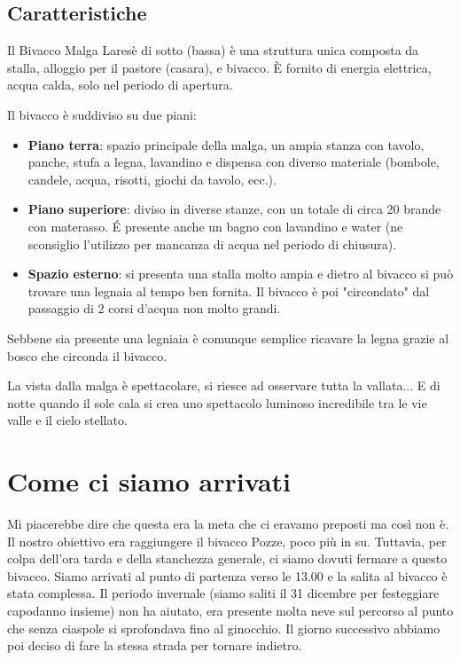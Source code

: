 \documentclass{article}
\begin{document}
\subsection{Caratteristiche}
Il Bivacco Malga Laresè di sotto (bassa) è una struttura unica composta da stalla, alloggio per il pastore (casara), e  bivacco. È fornito di energia elettrica, acqua calda, solo nel periodo di apertura.

Il bivacco è suddiviso su due piani:
\begin{itemize}
    \item \textbf{Piano terra}: spazio principale della malga, un ampia stanza con tavolo, panche, stufa a legna, lavandino e dispensa con diverso materiale (bombole, candele, acqua, risotti, giochi da tavolo, ecc.).
    \item \textbf{Piano superiore}: diviso in diverse stanze, con un totale di circa 20 brande con materasso. \'E presente anche un bagno con lavandino e water (ne sconsiglio l'utilizzo per mancanza di acqua nel periodo di chiusura).
    \item \textbf{Spazio esterno}: si presenta una stalla molto ampia e dietro al bivacco si può trovare una legnaia al tempo ben fornita. Il bivacco è poi "circondato" dal passaggio di 2 corsi d'acqua non molto grandi.
\end{itemize}

Sebbene sia presente una legniaia è comunque semplice ricavare la legna grazie al bosco che circonda il bivacco.

La vista dalla malga è spettacolare, si riesce ad osservare tutta la vallata... E di notte quando il sole cala si crea uno spettacolo luminoso incredibile tra le vie valle e il cielo stellato.

\section{Come ci siamo arrivati}
Mi piacerebbe dire che questa era la meta che ci eravamo preposti ma così non è. Il nostro obiettivo era raggiungere il bivacco Pozze, poco più in su. Tuttavia, per colpa dell'ora tarda e della stanchezza generale, ci siamo dovuti fermare a questo bivacco.
Siamo arrivati al punto di partenza verso le 13.00 e la salita al bivacco è stata complessa. Il periodo invernale (siamo saliti il 31 dicembre per festeggiare capodanno insieme) non ha aiutato, era presente molta neve sul percorso al punto che senza ciaspole si sprofondava fino al ginocchio. Il giorno successivo abbiamo poi deciso di fare la stessa strada per tornare indietro.
\end{document}

